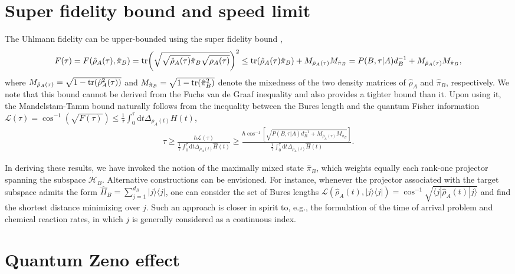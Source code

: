 \documentclass[prl,aps,amssymb,twocolumn,superscriptaddress, notitlepage, longbibliography]{revtex4-2}
\begin{document}
\section{Super fidelity bound and speed limit}
The Uhlmann fidelity can be upper-bounded using the super fidelity  bound \cite{Miszczak2008SubAS},
\begin{eqnarray}
    F(\tau)=F(\hat \rho_A(\tau),\hat \pi_B)=\tr(\sqrt{\sqrt{\hat \rho_A(\tau)}\hat \pi_B\sqrt{\rho_A(\tau)}})^2\leq\tr(\hat\rho_A(\tau)\hat\pi_B)+M_{\hat\rho_A(\tau)}M_{\hat\pi_B}=P(B,\tau\vert A)d^{-1}_B+M_{\hat\rho_A(\tau)}M_{\hat\pi_B},\nonumber\\
\end{eqnarray}
where $M_{\hat\rho_A(\tau)}=\sqrt{1-\tr(\hat\rho^2_A(\tau))}$ and $M_{\hat\pi_B}=\sqrt{1-\tr(\hat\pi^2_B)}$ denote the mixedness of the two density matrices of $\hat\rho_A$ and $\hat\pi_B$, respectively.
We note that this bound cannot be derived from the Fuchs van de Graaf inequality \cite{Bengtsson2017} and also provides a tighter bound than it.
Upon using it, the Mandelstam-Tamm bound naturally follows from the inequality between the Bures length and the quantum Fisher information $\mathcal L(\tau)=\cos^{-1}\left(\sqrt{F(\tau)}\right)\leq\frac{1}{\tau}\int_0^\tau\mathrm dt\Delta_{\rho_A(t)}H(t)$,
\begin{eqnarray}
    \tau\geq\frac{\hbar\mathcal L(\tau)}{\frac{1}{\tau}\int_0^\tau\mathrm dt\Delta_{\hat\rho_A(t)}\hat H(t)}\geq\frac{\hbar\cos^{-1}\left[\sqrt{P(B,\tau|A)d^{-1}_B+M_{\hat\rho_A(\tau)}M_{\hat\pi_B}}\right]}{\frac{1}{\tau}\int_0^\tau\mathrm dt\Delta_{\hat\rho_A(t)}\hat H(t)}.
\end{eqnarray}

In deriving these results, we have invoked the notion of the maximally mixed state $\hat \pi_B$, which weights equally each rank-one projector spanning the subspace $\mathcal{H}_B$.
Alternative constructions can be envisioned. For instance, whenever the projector associated with the target subspace admits the form $\hat\Pi_B=\sum_{j=1}^{d_B}|j\rangle\langle j|$, one can consider the set of Bures lengths $\mathcal{L}(\hat\rho_A(t),|j\rangle\langle j|)=\cos^{-1}\sqrt{\langle j|\hat\rho_A(t)|j\rangle}$ and find the shortest distance minimizing over $j$. Such an approach is closer in spirit to, e.g., the formulation of the time of arrival problem and chemical reaction rates, in which $j$ is generally considered as a continuous index.


\section{Quantum Zeno effect}
\end{document}
